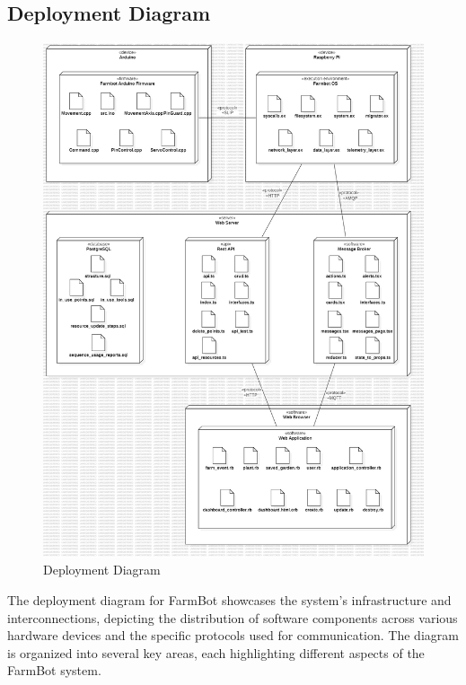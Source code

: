 \subsection{Deployment Diagram}
\begin{figure}[htbp]
    \centering
    \includegraphics[width=0.7\linewidth]{Figures/deployment_diagram.jpg}
    \caption{Deployment Diagram}
    \label{Deployment}
\end{figure}
\newpage
The deployment diagram for FarmBot showcases the system’s infrastructure and interconnections, depicting the distribution of software components across various hardware devices and the specific protocols used for communication. The diagram is organized into several key areas, each highlighting different aspects of the FarmBot system.
